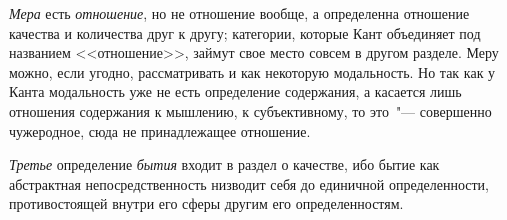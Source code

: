 \emph{Мера} есть \emph{отношение}, но не отношение вообще,
а определенна отношение качества и количества друг
к другу; категории, которые Кант объединяет под названием
<<отношение>>, займут свое место совсем в другом
разделе. Меру можно, если угодно, рассматривать и как
некоторую модальность. Но так как у Канта модальность
уже не есть определение содержания, а касается лишь
отношения содержания к мышлению, к субъективному,
то это~"--- совершенно чужеродное, сюда не принадлежащее
отношение.

\emph{Третье} определение \emph{бытия} входит в раздел о качестве,
ибо бытие как абстрактная непосредственность низводит
себя до единичной определенности, противостоящей
внутри его сферы другим его определенностям.





